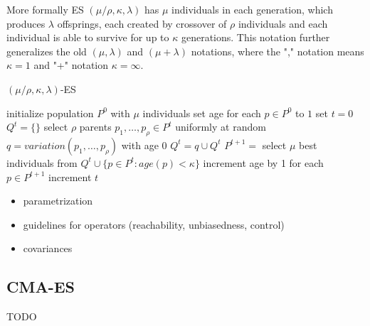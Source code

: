 More formally ES $(\mu / \rho,\kappa,\lambda)$ has $\mu$ individuals in each generation, which produces $\lambda$ offsprings, each created by crossover of $\rho$ individuals and each individual is able to survive for up to $\kappa$ generations. This notation further generalizes the old $(\mu,\lambda)$ and $(\mu+\lambda)$ notations, where the "," notation means $\kappa=1$ and "+" notation $\kappa=\infty$. 
\begin{algorithm}
\begin{algorithmic}[1]
\caption{$(\mu / \rho,\kappa,\lambda)$-ES}\label{alg:es}
    \State initialize population $P^0$ with $\mu$ individuals
    \State set age for each $p\in P^0$ to $1$
    \State set $t=0$
    \Repeat
        \State $Q^t = \{\}$
            \State select $\rho$ parents $p_1,\dots,p_\rho \in P^t$ uniformly at random
            \State $q = variation(p_1,\dots,p_\rho)$ with age $0$
            \State $Q^t = q \cup Q^t$
        \EndFor
        \State $P^{t+1} =$ select $\mu$ best individuals from $Q^t\cup \{p \in P^t: age(p)<\kappa\}$
        \State increment age by 1 for each $p \in P^{t+1}$
        \State increment $t$
\end{algorithmic}
\end{algorithm}
\cite{Schwefel1995}
\begin{itemize}
    \item parametrization
    \item guidelines for operators (reachability, unbiasedness, control)
    \item covariances
\end{itemize}
     \cite{Rudolph2012}
\subsection{CMA-ES}
\label{subsec:cma-es}
TODO \cite{Hansen06}
